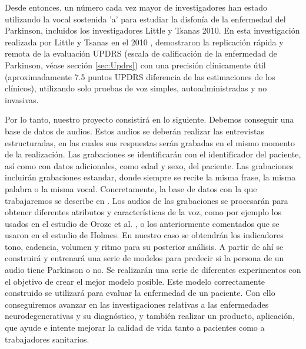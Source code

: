 Desde entonces, un número cada vez mayor de investigadores han estado utilizando la vocal sostenida 'a' para estudiar la disfonía de la enfermedad del Parkinson, incluidos los investigadores Little y Tsanas 2010. En esta investigación realizada por Little y Tsanas en el 2010 \cite{MxLtAccurate}, demostraron la replicación rápida y remota de la evaluación UPDRS (escala de calificación de la enfermedad de Parkinson, véase sección \ref{sec:Updrs}) con una precisión clínicamente útil (aproximadamente 7.5 puntos UPDRS diferencia de las estimaciones de los clínicos), utilizando solo pruebas de voz simples, autoadministradas y no invasivas.

Por lo tanto, nuestro proyecto consistirá en lo siguiente. Debemos conseguir una base de datos de audios. Estos audios se deberán realizar las entrevistas estructuradas, en las cuales sus respuestas serán grabadas en el mismo momento de la realización. Las grabaciones se identificarán con el identificador del paciente, así como con datos adicionales, como edad y sexo, del paciente. Las grabaciones incluirán grabaciones estandar, donde siempre se recite la misma frase, la misma palabra o la misma vocal. Concretamente, la base de datos con la que trabajaremos se describe en  \cite{OrzCorpus}. Los audios de las grabaciones se procesarán para obtener diferentes atributos y características de la voz, como por ejemplo los usados en el estudio de Orozc et al. \cite{Orz2016}, o los anteriormente comentados que se usaron en el estudio de Holmes. En nuestro caso se obtendrán los indicadores tono, cadencia, volumen y ritmo para su posterior análisis. A partir de ahí se construirá y entrenará una serie de modelos para predecir si la persona de un audio tiene Parkinson o no. Se realizarán una serie de diferentes experimentos con el objetivo de crear el mejor modelo posible. Este modelo correctamente construido se utilizará para evaluar la enfermedad de un paciente. Con ello conseguiremos avanzar en las investigaciones relativas a las enfermedades neurodegenerativas y su diagnóstico, y también realizar un producto, aplicación, que ayude e intente mejorar la calidad de vida tanto a pacientes como a trabajadores sanitarios.




